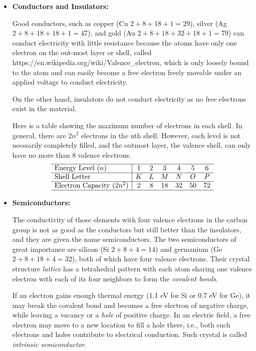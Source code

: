 \begin{itemize}
\item {\bf Conductors and Insulators:} 

Good conductors, such as copper (Cu $2+8+18+1=29$), silver (Ag $2+8+18+18+1=47$),
and gold (Au $2+8+18+32+18+1=79$) can conduct electricity with little resistance 
because the atoms have only one electron on the out-most layer or shell, called
{https://en.wikipedia.org/wiki/Valence_electron}, which is only loosely bound 
to the atom and can easily become a free electron freely movable under an applied
voltage to conduct electricity. 

On the other hand, insulators do not conduct electricity as no free electrons 
exist in the material.

Here is a table showing the maximum number of electrons in each shell.
In general, there are $2n^2$ electrons in the nth shell. However, each 
level is not necssarily completely filled, and the outmost layer, the 
valence shell, can only have no more than 8 valence electrons.
\[
\begin{array}{l|cccccc} \hline
\mbox{Energy Level } (n) & 1 & 2 & 3 & 4 & 5 & 6 \\ \hline
\mbox{Shell Letter} & K & L & M & N & O & P  \\ \hline
\mbox{Electron Capacity } (2n^2) & 2 & 8 & 18 & 32 & 50 & 72 \\ \hline
\end{array}
\]


\item {\bf Semiconductors:} 

The conductivity of those elements with four valence electrons in the carbon 
group is not as good as the conductors but still better than the insulators, 
and they are given the name semiconductors. The two semiconductors of great 
importance are silicon (Si $2+8+4=14$) and germanium (Ge $2+8+18+4=32$), both 
of which have four valence electrons. Their crystal structure {\em lattice}
has a tetrahedral pattern with each atom sharing one valence electron with 
each of its four neighbors to form the {\em covalent bonds}. 

If an electron gains enough thermal energy (1.1 eV for Si or 0.7 eV for
Ge), it may break the covalent bond and becomes a free electron of negative
charge, while leaving a vacancy or a {\em hole} of positive charge. In an 
electric field, a free electron may move to a new location to fill a hole 
there, i.e., both such electrons and holes contribute to electrical conduction. 
Such crystal is called {\em intrinsic semiconductor}.


\end{itemize}
